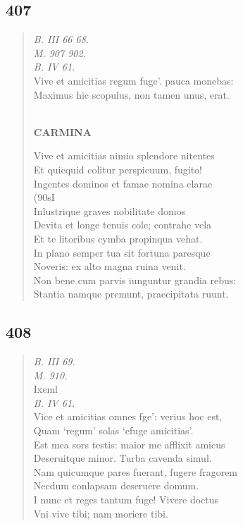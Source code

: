 \documentclass[11pt, a4paper]{report}
\begin{document}
            \subsection*{407}
      \begin{verse}
      \textit{B. III 66 68.} \\ \textit{M. 907 902.} \\ \textit{B. IV 61.} \\ Vive et amicitias regum fuge’. pauca monebas: \\ Maximus hic scopulus, non tamen unus, erat. \\ 
        ﻿\pagebreak 
     \marginpar{[316]} \begin{center} \textbf{CARMINA} \end{center}Vive et amicitias nimio splendore nitentes \\ Et quicquid colitur perspicuum, fugito! \\ Ingentes dominos et famae nomina clarae \\ (90sI \\ Inlustrique graves nobilitate domos \\ Devita et longe tenuis cole; contrahe vela \\ Et te litoribus cymba propinqua vehat. \\ In plano semper tua sit fortuna paresque \\ Noveris: ex alto magna ruina venit. \\ Non bene cum parvis iunguntur grandia rebus: \\ Stantia namque premunt, praecipitata ruunt. \\ 
      \end{verse}
  
            \subsection*{408}
      \begin{verse}
      \textit{B. III 69.} \\ \textit{M. 910.} \\ Ixeml \\ \textit{B. IV 61.} \\ Vice et amicitias omnes fge’: verius hoc est, \\ Quam ‘regum’ solas ‘efuge amicitias’. \\ Est mea sors testis: maior me afflixit amicus \\ Deseruitque minor. Turba cavenda simul. \\ Nam quicumque pares fuerant, fugere fragorem \\ Necdum conlapsam deseruere domum. \\  \lbrack I nunc et reges tantum fuge! Vivere doctus \\ Vni vive tibi; nam moriere tibi. \\ 
      \end{verse}
  
\end{document}

